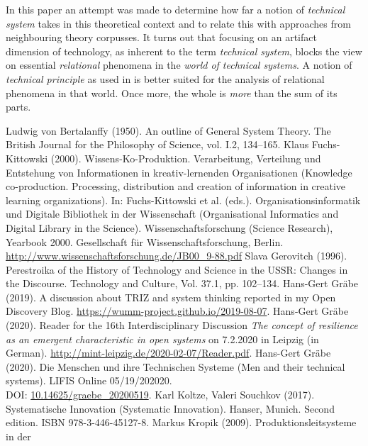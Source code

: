 \documentclass{llncs}
\begin{document}
In this paper an attempt was made to determine how far a notion of
\emph{technical system} takes in this theoretical context and to relate this
with approaches from neighbouring theory corpusses.  It turns out that
focusing on an artifact dimension of technology, as inherent to the term
\emph{technical system}, blocks the view on essential \emph{relational}
phenomena in the \emph{world of technical systems}. A notion of
\emph{technical principle} as used in \cite{Shpakovsky2010} is better suited
for the analysis of relational phenomena in that world. Once more, the whole
is \emph{more} than the sum of its parts.

\begin{thebibliography}{xxx}
 Ludwig von Bertalanffy (1950). An outline of General
  System Theory. The British Journal for the Philosophy of Science, vol. I.2,
  134–165.
 Klaus Fuchs-Kittowski (2000).  Wissens-Ko-Produktion.
  Verarbeitung, Verteilung und Entstehung von Informationen in
  kreativ-lernenden Organisationen (Knowledge co-production. Processing,
  distribution and creation of information in creative learning
  organizations). In: Fuchs-Kittowski et al. (eds.). Organisationsinformatik
  und Digitale Bibliothek in der Wissenschaft (Organisational Informatics and
  Digital Library in the Science). Wissenschaftsforschung (Science Research),
  Yearbook 2000. Gesellschaft für Wissenschaftsforschung, Berlin.
  \url{http://www.wissenschaftsforschung.de/JB00_9-88.pdf}
 Slava Gerovitch (1996). Perestroika of the History of
  Technology and Science in the USSR: Changes in the Discourse. Technology and
  Culture, Vol. 37.1, pp. 102--134.
 Hans-Gert Gräbe (2019). A discussion about TRIZ and
  system thinking reported in my Open Discovery Blog.
  \url{https://wumm-project.github.io/2019-08-07}. 
 Hans-Gert Gräbe (2020). Reader for the 16th
  Interdisciplinary Discussion \emph{The concept of resilience as an emergent
    characteristic in open systems} on 7.2.2020 in Leipzig (in German).
  \url{http://mint-leipzig.de/2020-02-07/Reader.pdf}.
 Hans-Gert Gräbe (2020). Die Menschen und ihre
  Technischen Systeme (Men and their technical systems). LIFIS Online
  05/19/202020.  \\ DOI: \url{10.14625/graebe_20200519}.
 Karl Koltze, Valeri Souchkov (2017). Systematische Innovation
  (Systematic Innovation). Hanser, Munich. Second edition. ISBN
  978-3-446-45127-8.
 Markus Kropik (2009). Produktionsleitsysteme in der

\end{thebibliography}
\end{document}
